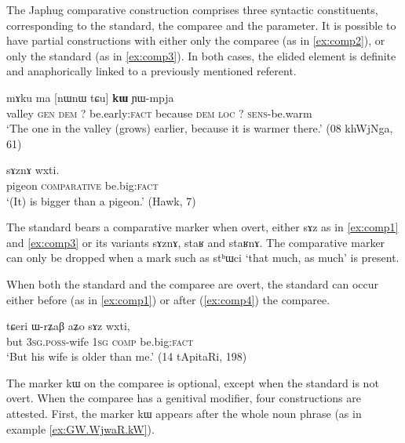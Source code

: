 \documentclass[oldfontcommands,oneside,a4paper,11pt]{article}
\newcommand{\ipa}[1]{{\phon #1}} %
\begin{document}
 

The Japhug comparative construction comprises three syntactic constituents, corresponding to the standard, the comparee and the parameter. It is possible to have partial constructions with either only the comparee  (as in \ref{ex:comp2}), or only the standard (as in \ref{ex:comp3}). In both cases, the elided element is definite and anaphorically linked to a previously mentioned referent.

 \begin{exe}
\ex \label{ex:comp2}
\gll 
[\ipa{co}  	\ipa{ɣɯ}  	\ipa{nɯnɯ}]  	\ipa{\textbf{kɯ}}  	\ipa{mɤku}  	\ipa{ma}  	[\ipa{nɯnɯ} \ipa{tɕu}]  	\ipa{\textbf{kɯ}}  	\ipa{ɲɯ-mpja}  \\
valley \textsc{gen} \textsc{dem} ?{ } be.early:\textsc{fact} because \textsc{dem} \textsc{loc} ?{ } \textsc{sens}-be.warm \\
\glt `The one in the valley (grows) earlier, because it is warmer there.' (08 khWjNga, 61)
\end{exe}

\begin{exe}
\ex \label{ex:comp3}
\gll  \ipa{qɤjdo}  	\ipa{sɤznɤ}  	\ipa{wxti.}     \\
pigeon \textsc{comparative} be.big:\textsc{fact} \\
\glt `(It) is bigger than a pigeon.' (Hawk, 7)
\end{exe}


The standard  bears a comparative marker when overt, either \ipa{sɤz} as in \ref{ex:comp1} and \ref{ex:comp3} or its variants \ipa{sɤznɤ}, \ipa{staʁ} and \ipa{staʁnɤ}. The comparative marker can only be dropped when a mark such as \ipa{stʰɯci} `that much, as much' is present.
 
 When both the standard and the comparee are overt, the standard can occur either before (as in  \ref{ex:comp1}) or after (\ref{ex:comp4}) the comparee.  
 
\begin{exe}
\ex \label{ex:comp4}
\gll 
\ipa{tɕeri}  	\ipa{ɯ-rʑaβ}  	\ipa{aʑo}  	\ipa{sɤz}  	\ipa{wxti,}  \\
but \textsc{3sg.poss}-wife \textsc{1sg} \textsc{comp} be.big:\textsc{fact} \\
\glt `But his wife is older than me.' (14 tApitaRi, 198)
\end{exe}


The marker \ipa{kɯ} on the comparee is optional, except when the standard is not overt. When the comparee has a genitival modifier, four constructions are attested. First,  the marker \ipa{kɯ} appears after the whole noun phrase (as in example \ref{ex:GW.WjwaR.kW}). 
\end{document}
